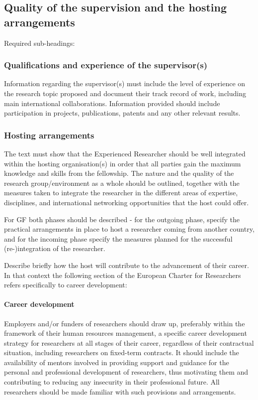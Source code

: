 \documentclass[a4paper,11pt]{article}
\begin{document}
\subsection{Quality of the supervision and the hosting arrangements}
\label{sec:supervision}

Required sub-headings:

\subsubsection*{Qualifications and experience of the supervisor(s)}

Information regarding the supervisor(s) must include the level of experience on the research topic proposed and document their track record of work, including main international collaborations. Information provided should include participation in projects, publications, patents and any other relevant results.

\subsubsection*{Hosting arrangements}

The text must show that the Experienced Researcher should be well integrated within the hosting organisation(s) in order that all parties gain the maximum knowledge and skills from the fellowship. The nature and the quality of the research group/environment as a whole should be outlined, together with the measures taken to integrate the researcher in the different areas of expertise, disciplines, and international networking opportunities that the host could offer.

For GF both phases should be described - for the outgoing phase, specify the practical arrangements in place to host a researcher coming from another country, and for the incoming phase specify the measures planned for the successful (re-)integration of the researcher.

Describe briefly how the host will contribute to the advancement of their career.  In that context the following section of the European Charter for Researchers refers specifically to career development:

\paragraph{Career development}
Employers and/or funders of researchers should draw up, preferably within the framework of their human resources management, a specific career development strategy for researchers at all stages of their career, regardless of their contractual situation, including researchers on fixed-term contracts. It should include the availability of mentors involved in providing support and guidance for the personal and professional development of researchers, thus motivating them and contributing to reducing any insecurity in their professional future. All researchers should be made familiar with such provisions and arrangements. 
\end{document}
